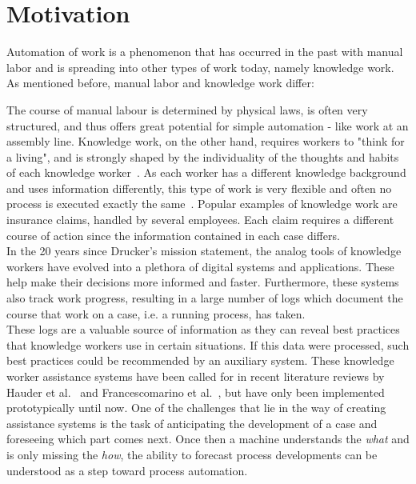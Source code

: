 \section{Motivation} \label{sec:intro:motivation}
Automation of work is a phenomenon that has occurred in the past with manual labor and is spreading into other types of work today, namely knowledge work. As mentioned before, manual labor and knowledge work differ:

The course of manual labour is determined by physical laws, is often very structured, and thus offers great potential for simple automation - like work at an assembly line. Knowledge work, on the other hand, requires workers to "think for a living", and is strongly shaped by the individuality of the thoughts and habits of each knowledge worker~\cite{drucker1999}. As each worker has a different knowledge background and uses information differently, this type of work is very flexible and often no process is executed exactly the same~\cite{hewelt2016}. Popular examples of knowledge work are insurance claims, handled by several employees. Each claim requires a different course of action since the information contained in each case differs.\\

In the 20 years since Drucker's mission statement, the analog tools of knowledge workers have evolved into a plethora of digital systems and applications. These help make their decisions more informed and faster. Furthermore, these systems also track work progress, resulting in a large number of logs which document the course that work on a case, i.e. a running process, has taken.\\

These logs are a valuable source of information as they can reveal best practices that knowledge workers use in certain situations. If this data were processed, such best practices could be recommended by an auxiliary system. These knowledge worker assistance systems have been called for in recent literature reviews by Hauder et al.~\cite{hauder2014} and Francescomarino et al.~\cite{francescomarino2018}, but have only been implemented prototypically until now. One of the challenges that lie in the way of creating assistance systems is the task of anticipating the development of a case and foreseeing which part comes next. Once then a machine understands the \textit{what} and is only missing the \textit{how}, the ability to forecast process developments can be understood as a step toward process automation.\\

